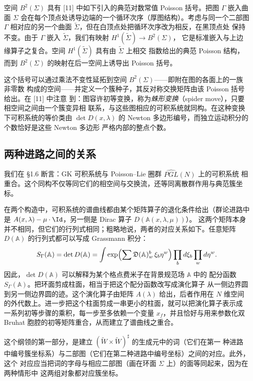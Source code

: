 空间 $B^2(\Sigma)$ 具有 [11] 中如下引入的典范对数常值 Poisson 括号。把图 $\Gamma$
嵌入曲面 $\Sigma$ 会在每个顶点处诱导边端的一个循环次序（厚图结构）。考虑与同一个二部图
$\Gamma$ 相对应的另一个曲面 $\tilde\Sigma$，但在白顶点处把循环次序改为相反，在黑顶点处
保持不变。由于 $\Gamma$ 嵌入 $\tilde\Sigma$，我们有映射 $H^1(\tilde\Sigma)\to B^2(\Sigma)$，
它是标准嵌入与上边缘算子之复合。空间 $H^1(\tilde\Sigma)$ 具有由 $\tilde\Sigma$ 上相交
指数给出的典范 Poisson 结构，而到 $B^2(\Sigma)$ 的映射在后一空间上诱导出 Poisson 括号。

这个括号可以通过乘法不变性延拓到空间 $B^2(\Sigma)$——即附在图的各面上的一族非零数
构成的空间——并定义一个簇种子，其反对称交换矩阵由该 Poisson 括号给出。在 [11] 中注意
到：图容许初等变换，称为\emph{蛛形变换}（spider move），只要相空间之间由一个簇变异相
联系，与这些图相应的可积系统就同构。在这种变换下可积系统的等价类由
$\det D(x,\lambda)$ 的 Newton 多边形编号，而独立运动积分的个数恰好是这些 Newton 多边形
严格内部的整点个数。

\subsection{两种进路之间的关系}

我们在 §1.6 断言：GK 可积系统与 Poisson--Lie 圈群 $\widehat{PGL}(N)$ 上的可积系统
相重合。这个同构不仅等同它们的相空间与交换流，还等同离散群作用与典范簇坐标。

在两个构造中，可积系统的谱曲线都由某个矩阵算子的退化条件给出（群论进路中是
$A(x,\lambda)-\mu\cdot\Id$，另一侧是 Dirac 算子 $D(\mathbb{A}(x,\lambda,\mu))$）。
这两个矩阵本身并不相同，但它们的行列式相同；粗略地说，两者的对应关系如下。任意矩阵 $D(\mathbb{A})$
的行列式都可以写成 Grassmann 积分：\hfil
\[
S_\Gamma(\mathbb{A})=\det D(\mathbb{A})
=\int \exp\Bigl(\sum \mathfrak{D}(\mathbb{A})^b_w\,\xi_b\eta^w\Bigr)
\prod_b d\xi_b\prod_w d\eta^w .
\]
因此，$\det D(\mathbb{A})$ 可以解释为某个格点费米子在背景规范场 $\mathbb{A}$ 中的
配分函数 $S_\Gamma(\mathbb{A})$。把环面剪成柱面，相当于把这个配分函数改写成演化算子
从一侧边界圆到另一侧边界圆的迹。这个演化算子由矩阵 $A(\lambda)$ 给出，后者作用在
$N$ 维空间的外代数上。进一步把这个柱面剪成一串更小的柱面，就可以把演化算子表示成
一系列初等步骤的乘积，每一步至多依赖一个变量 $x_f$，并且恰好与用来参数化双 Bruhat
胞腔的初等矩阵重合，从而建立了谱曲线之重合。

这个纲领的第一部分，是建立 $(\tilde W\times\tilde W)^\sharp$ 的生成元中的词（它们在第一
种进路中编号簇坐标系）与二部图（它们在第二种进路中编号坐标）之间的对应。此外，这个
对应应当把词的字母与相应二部图（画在环面 $\Sigma$ 上）的面等同起来，因为在两种情形中
这两组对象都对应簇坐标。

